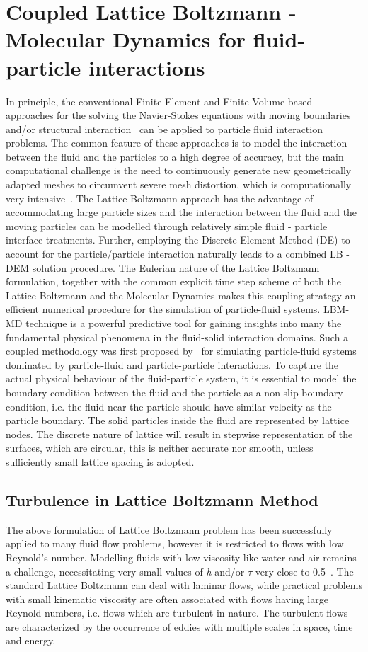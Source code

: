 \section{Coupled Lattice Boltzmann - Molecular Dynamics for fluid-particle interactions}
In principle, the conventional Finite Element and Finite Volume based approaches for the solving the Navier-Stokes equations with moving boundaries and/or structural interaction~\citep{bathe2004} can be applied to particle fluid interaction problems. The common feature of these approaches is to model the interaction between the fluid and the particles to a high degree of accuracy, but the main computational challenge is the need to continuously generate new geometrically adapted meshes to circumvent severe mesh distortion, which is computationally very intensive~\citep{han2007}. The Lattice Boltzmann approach has the advantage of accommodating large particle sizes and the interaction between the fluid and the moving particles can be modelled through relatively simple fluid - particle interface treatments. Further, employing the Discrete Element Method (DE) to account for the particle/particle interaction naturally leads to a combined LB - DEM solution procedure. The Eulerian nature of the Lattice Boltzmann formulation, together with the common explicit time step scheme of both the Lattice Boltzmann and the Molecular Dynamics makes this coupling strategy an efficient numerical procedure for the simulation of particle-fluid systems. LBM-MD technique is a powerful predictive tool for gaining insights into many the fundamental physical phenomena in the fluid-solid interaction domains. Such a coupled methodology was first proposed by~\citep{cook2004} for simulating particle-fluid systems dominated by particle-fluid and particle-particle interactions. To capture the actual physical behaviour of the fluid-particle system, it is essential to model the boundary condition between the fluid and the particle as a non-slip boundary condition, i.e. the fluid near the particle should have similar velocity as the particle boundary. The solid particles inside the fluid are represented by lattice nodes. The discrete nature of lattice will result in stepwise representation of the surfaces, which are circular, this is neither accurate nor smooth, unless sufficiently small lattice spacing is adopted. 


\subsection{Turbulence in Lattice Boltzmann Method}
The above formulation of Lattice Boltzmann problem has been successfully applied to many fluid flow problems, however it is restricted to flows with low Reynold's number. Modelling fluids with low viscosity like water and air remains a challenge, necessitating very small values of \textit{h} and/or $\tau$ very close to 0.5~\citep{he1997}. The standard Lattice Boltzmann can deal with laminar flows, while practical problems with small kinematic viscosity are often associated with flows having large Reynold numbers, i.e. flows which are turbulent in nature. The turbulent flows are characterized by the occurrence of eddies with multiple scales in space, time and energy.

